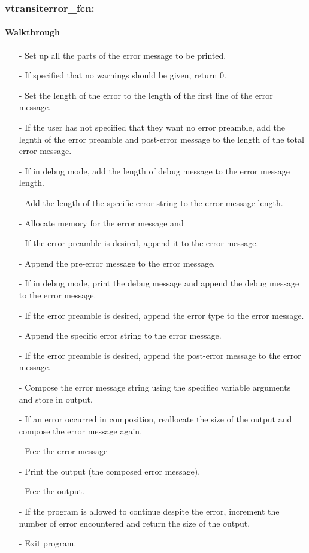 \documentclass[letterpaper,12pt]{article}
\begin{document}
\subsubsection{vtransiterror\_fcn:}
\paragraph{Walkthrough}
\begin{enumerate}[leftmargin=10pt, noitemsep, parsep=0pt, topsep=0ex]
\item[-] Set up all the parts of the error message to be printed.
\item[-] If specified that no warnings should be given, return 0.
\item[-] Set the length of the error to the length of the first line of the error message.
\item[-] If the user has not specified that they want no error preamble, add the legnth of the error preamble and post-error message to the length of the total error message.
\item[-] If in debug mode, add the length of debug message to the error message length.
\item[-] Add the length of the specific error string to the error message length.
\item[-] Allocate memory for the error message and 
\item[-] If the error preamble is desired, append it to the error message.
\item[-] Append the pre-error message to the error message.
\item[-] If in debug mode, print the debug message and append the debug message to the error message.
\item[-] If the error preamble is desired, append the error type to the error message.
\item[-] Append the specific error string to the error message.
\item[-] If the error preamble is desired, append the post-error message to the error message.
\item[-] Compose the error message string using the specifiec variable arguments and store in output.
\item[-] If an error occurred in composition, reallocate the size of the output and compose the error message again.
\item[-] Free the error message
\item[-] Print the output (the composed error message).
\item[-] Free the output.
\item[-] If the program is allowed to continue despite the error, increment the number of error encountered and return the size of the output.
\item[-] Exit program.
\end{enumerate}
\end{document}
